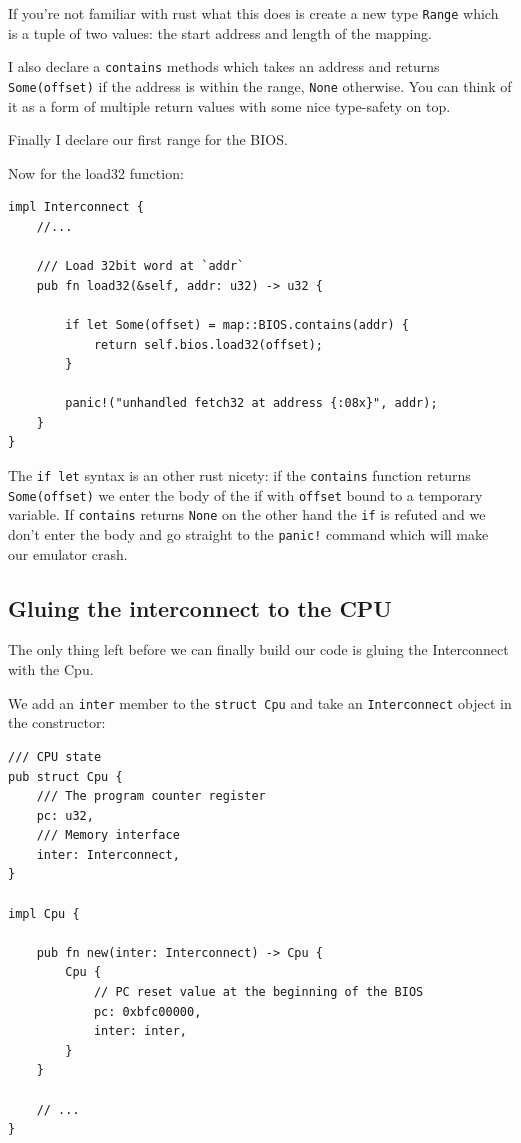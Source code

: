 \documentclass[a4paper]{article}
\newcommand{\code}[1] {\texttt{#1}}
\begin{document}
If you're not familiar with rust what this does is create a new type
\code{Range} which is a tuple of two values: the start address and length
of the mapping.

I also declare a \code{contains} methods which takes an address and
returns \code{Some(offset)} if the address is within the range,
\code{None} otherwise. You can think of it as a form of multiple
return values with some nice type-safety on top.

Finally I declare our first range for the BIOS.

Now for the load32 function:

\begin{lstlisting}
impl Interconnect {
    //...

    /// Load 32bit word at `addr`
    pub fn load32(&self, addr: u32) -> u32 {

        if let Some(offset) = map::BIOS.contains(addr) {
            return self.bios.load32(offset);
        }

        panic!("unhandled fetch32 at address {:08x}", addr);
    }
}
\end{lstlisting}

The \code{if let} syntax is an other rust nicety: if the
\code{contains} function returns \code{Some(offset)} we enter the
body of the if with \code{offset} bound to a temporary variable. If
\code{contains} returns \code{None} on the other hand the
\code{if} is refuted and we don't enter the body and go straight to
the \code{panic!} command which will make our emulator crash.

\subsection{Gluing the interconnect to the CPU}

The only thing left before we can finally build our code is gluing the
Interconnect with the Cpu.

We add an \code{inter} member to the \code{struct Cpu} and take an
\code{Interconnect} object in the constructor:

\begin{lstlisting}
/// CPU state
pub struct Cpu {
    /// The program counter register
    pc: u32,
    /// Memory interface
    inter: Interconnect,
}

impl Cpu {

    pub fn new(inter: Interconnect) -> Cpu {
        Cpu {
            // PC reset value at the beginning of the BIOS
            pc: 0xbfc00000,
            inter: inter,
        }
    }

    // ...
}
\end{lstlisting}
\end{document}
